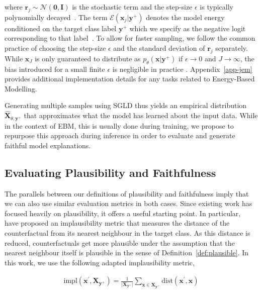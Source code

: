 \documentclass{article}
\begin{document}
where $\mathbf{r}_j \sim \mathcal{N}(\mathbf{0},\mathbf{I})$ is the stochastic term and the step-size $\epsilon$ is typically polynomially decayed~\citep{welling2011bayesian}. The term $\mathcal{E}(\mathbf{x}_j|\mathbf{y}^+)$ denotes the model energy conditioned on the target class label $\mathbf{y}^+$ which we specify as the negative logit corresponding to that label~\citep{grathwohl2020your}. To allow for faster sampling, we follow the common practice of choosing the step-size $\epsilon$ and the standard deviation of $\mathbf{r}_j$ separately. While $\mathbf{x}_J$ is only guaranteed to distribute as $p_{\theta}(\mathbf{x}|\mathbf{y}^+)$ if $\epsilon \rightarrow 0$ and $J \rightarrow \infty$, the bias introduced for a small finite $\epsilon$ is negligible in practice \citep{murphy2023probabilistic,grathwohl2020your}. Appendix~\ref{app-jem} provides additional implementation details for any tasks related to Energy-Based Modelling. 

Generating multiple samples using SGLD thus yields an empirical distribution $\hat{\mathbf{X}}_{\theta,\mathbf{y}^+}$ that approximates what the model has learned about the input data. While in the context of EBM, this is usually done during training, we propose to repurpose this approach during inference in order to evaluate and generate faithful model explanations.

\subsection{Evaluating Plausibility and Faithfulness}

The parallels between our definitions of plausibility and faithfulness imply that we can also use similar evaluation metrics in both cases. Since existing work has focused heavily on plausibility, it offers a useful starting point. In particular,~\citet{guidotti2022counterfactual} have proposed an implausibility metric that measures the distance of the counterfactual from its nearest neighbour in the target class. As this distance is reduced, counterfactuals get more plausible under the assumption that the nearest neighbour itself is plausible in the sense of Definition~\ref{def:plausible}. In this work, we use the following adapted implausibility metric,

\begin{equation}\label{eq:impl}
  \begin{aligned}
    \text{impl}(\mathbf{x}^{\prime},\mathbf{X}_{\mathbf{y}^+}) = \frac{1}{\lvert\mathbf{X}_{\mathbf{y}^+}\rvert} \sum_{\mathbf{x} \in \mathbf{X}_{\mathbf{y}^+}} \text{dist}(\mathbf{x}^{\prime},\mathbf{x})
  \end{aligned}
\end{equation}
\end{document}
